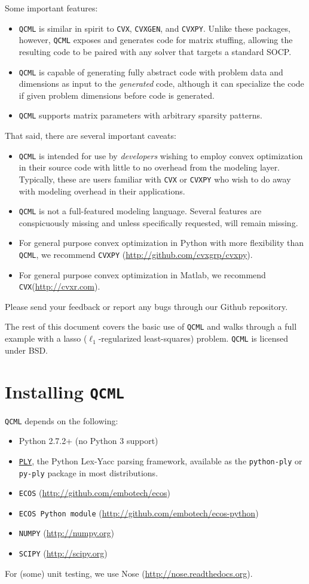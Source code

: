 \documentclass[11pt]{article}
\def\qcml{\texttt{QCML}\xspace}
\def\cvxpy{\texttt{CVXPY}\xspace}
\def\cvx{\texttt{CVX}\xspace}
\def\cvxgen{\texttt{CVXGEN}\xspace}
\begin{document}
Some important features:
\begin{itemize}
\item \qcml is similar in spirit to \cvx, \cvxgen, and
\cvxpy. Unlike these packages, however, \qcml exposes and generates code
for matrix stuffing, allowing the resulting code to be paired with any solver
that targets a standard SOCP.
\item \qcml is capable of generating fully abstract code with problem data and
dimensions as input to the \emph{generated} code, although it can specialize
the code if given problem dimensions before code is generated.
\item \qcml supports matrix parameters with arbitrary sparsity patterns.
\end{itemize}
That said, there are several important caveats:
\begin{itemize}
\item \qcml is intended for use by \emph{developers} wishing to employ convex
optimization in their source code with little to no overhead from the modeling
layer. Typically, these are users familiar with \cvx or \cvxpy who wish to
do away with modeling overhead in their applications.
\item \qcml is not a full-featured modeling language. Several features are
conspicuously missing and unless specifically requested, will remain missing.
\item For general purpose convex optimization in Python with more flexibility
than \qcml, we recommend \cvxpy
(\url{http://github.com/cvxgrp/cvxpy}).
\item For general purpose convex optimization in Matlab, we recommend
\cvx (\url{http://cvxr.com}).
\end{itemize}
Please send your feedback or report any bugs through our Github repository.

The rest of this document covers the basic use of \qcml and walks through a
full example with a lasso ($\ell_1$-regularized least-squares) problem.
\qcml is licensed under BSD.

\newpage
\tableofcontents
\newpage

\section{Installing \qcml}
\qcml depends on the following:
\begin{itemize}
\item Python 2.7.2+ (no Python 3 support)
\item \href{http://www.dabeaz.com/ply/}{\tt PLY}, the Python Lex-Yacc parsing framework,
  available as the {\tt python-ply} or {\tt py-ply} package in most distributions.
\item {\tt ECOS} (\url{http://github.com/embotech/ecos})
\item {\tt ECOS Python module} (\url{http://github.com/embotech/ecos-python})
\item {\tt NUMPY} (\url{http://numpy.org})
\item {\tt SCIPY} (\url{http://scipy.org})
\end{itemize}
For (some) unit testing, we use Nose (\url{http://nose.readthedocs.org}).
\end{document}
